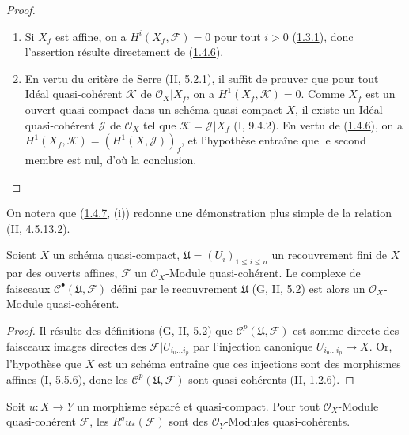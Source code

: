 \begin{proof}
\begin{enumerate}
\item[(i)] Si $X_f$ est affine, on a $H^i(X_f,\mathcal F)=0$ pour tout
$i>0$ (\hyperref[III.1.3.1-fr]{1.3.1}), donc l'assertion résulte directement
de (\hyperref[III.1.4.6-fr]{1.4.6}).
\item[(ii)] En vertu du critère de Serre (II, 5.2.1), il suffit de prouver
que pour tout Idéal quasi-cohérent $\mathcal K$ de
$\mathcal O_X\vert X_f$, on a $H^1(X_f,\mathcal K)=0$. Comme $X_f$ est un
ouvert quasi-compact dans un schéma quasi-compact $X$, il existe un Idéal
quasi-cohérent $\mathcal J$ de $\mathcal O_X$ tel que
$\mathcal K=\mathcal J\vert X_f$ (I, 9.4.2). En vertu de
(\hyperref[III.1.4.6-fr]{1.4.6}), on a
$H^1(X_f,\mathcal K)=(H^1(X,\mathcal J))_f$, et l'hypothèse entraîne que le
second membre est nul, d'où la conclusion.
\end{enumerate}
\end{proof}

\begin{remark}[1.4.8]
\label{III.1.4.8-fr}
On notera que (\hyperref[III.1.4.7-fr]{1.4.7}, (i)) redonne une
démonstration plus simple de la relation (II, 4.5.13.2).
\end{remark}

\begin{lemma}[1.4.9]
\label{III.1.4.9-fr}
Soient $X$ un schéma quasi-compact,
$\mathfrak U=(U_i)_{1\leq i\leq n}$ un recouvrement fini de $X$ par des
ouverts affines, $\mathcal F$ un $\mathcal O_X$-Module quasi-cohérent. Le
complexe de faisceaux $\mathcal C^\bullet(\mathfrak U,\mathcal F)$ défini
par le recouvrement $\mathfrak U$ (G, II, 5.2) est alors un
$\mathcal O_X$-Module quasi-cohérent.
\end{lemma}

\begin{proof}
Il résulte des définitions (G, II, 5.2) que
$\mathcal C^p(\mathfrak U,\mathcal F)$ est somme directe des faisceaux
images directes des $\mathcal F\vert U_{i_0\ldots i_p}$ par l'injection
canonique $U_{i_0\ldots i_p}\to X$. Or, l'hypothèse que $X$ est un schéma
entraîne que ces injections sont des morphismes affines (I, 5.5.6), donc les
$\mathcal C^p(\mathfrak U,\mathcal F)$ sont quasi-cohérents (II, 1.2.6).
\end{proof}

\begin{proposition}[1.4.10]
\label{III.1.4.10-fr}
Soit $u:X\to Y$ un morphisme séparé et quasi-compact. Pour tout
$\mathcal O_X$-Module quasi-cohérent $\mathcal F$, les
$R^qu_*(\mathcal F)$ sont des $\mathcal O_Y$-Modules quasi-cohérents.
\end{proposition}

